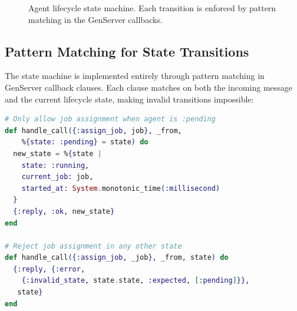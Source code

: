 \documentclass[12pt,a4paper]{article}
\theoremstyle{definition}
\theoremstyle{remark}
\begin{document}
\begin{figure}[H]
\centering
{}
\caption{Agent lifecycle state machine. Each transition is enforced by pattern matching in the GenServer callbacks.}\label{fig:exec-states}
\end{figure}

\subsection{Pattern Matching for State Transitions}

The state machine is implemented entirely through pattern matching in GenServer callback clauses. Each clause matches on both the incoming message and the current lifecycle state, making invalid transitions impossible:

\begin{lstlisting}[language=elixir, caption={Pattern matching enforces valid transitions (from \texttt{agent.ex})}, label={lst:pattern-matching}]
# Only allow job assignment when agent is :pending
def handle_call({:assign_job, job}, _from,
    %{state: :pending} = state) do
  new_state = %{state |
    state: :running,
    current_job: job,
    started_at: System.monotonic_time(:millisecond)
  }
  {:reply, :ok, new_state}
end

# Reject job assignment in any other state
def handle_call({:assign_job, _job}, _from, state) do
  {:reply, {:error,
    {:invalid_state, state.state, :expected, [:pending]}},
   state}
end
\end{lstlisting}
\end{document}
